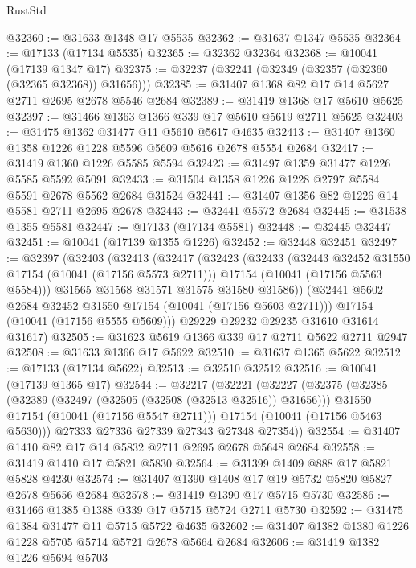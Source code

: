 \begin{lexlean}{RustStd}
\begin{coremodule}
@32360 := @31633 @1348 @17 @5535
@32362 := @31637 @1347 @5535
@32364 := @17133 (@17134 @5535)
@32365 := @32362 @32364
@32368 := @10041 (@17139 @1347 @17)
@32375 := @32237 (@32241 (@32349 (@32357 (@32360 (@32365 @32368)) @31656)))
@32385 := @31407 @1368 @82 @17 @14 @5627 @2711 @2695 @2678 @5546 @2684
@32389 := @31419 @1368 @17 @5610 @5625
@32397 := @31466 @1363 @1366 @339 @17 @5610 @5619 @2711 @5625
@32403 := @31475 @1362 @31477 @11 @5610 @5617 @4635
@32413 := @31407 @1360 @1358 @1226 @1228 @5596 @5609 @5616 @2678 @5554 @2684
@32417 := @31419 @1360 @1226 @5585 @5594
@32423 := @31497 @1359 @31477 @1226 @5585 @5592 @5091
@32433 := @31504 @1358 @1226 @1228 @2797 @5584 @5591 @2678 @5562 @2684 @31524
@32441 := @31407 @1356 @82 @1226 @14 @5581 @2711 @2695 @2678
@32443 := @32441 @5572 @2684
@32445 := @31538 @1355 @5581
@32447 := @17133 (@17134 @5581)
@32448 := @32445 @32447
@32451 := @10041 (@17139 @1355 @1226)
@32452 := @32448 @32451
@32497 := @32397
    (@32403
      (@32413
        (@32417
          (@32423
            (@32433
              (@32443 @32452 @31550 @17154 (@10041 (@17156 @5573 @2711)))
              @17154
              (@10041 (@17156 @5563 @5584)))
            @31565
            @31568
            @31571
            @31575
            @31580
            @31586))
        (@32441 @5602 @2684 @32452 @31550 @17154 (@10041 (@17156 @5603 @2711)))
        @17154
        (@10041 (@17156 @5555 @5609)))
      @29229
      @29232
      @29235
      @31610
      @31614
      @31617)
@32505 := @31623 @5619 @1366 @339 @17 @2711 @5622 @2711 @2947
@32508 := @31633 @1366 @17 @5622
@32510 := @31637 @1365 @5622
@32512 := @17133 (@17134 @5622)
@32513 := @32510 @32512
@32516 := @10041 (@17139 @1365 @17)
@32544 := @32217
    (@32221
      (@32227
        (@32375
          (@32385
            (@32389 (@32497 (@32505 (@32508 (@32513 @32516)) @31656)))
            @31550
            @17154
            (@10041 (@17156 @5547 @2711)))
          @17154
          (@10041 (@17156 @5463 @5630)))
        @27333
        @27336
        @27339
        @27343
        @27348
        @27354))
@32554 := @31407 @1410 @82 @17 @14 @5832 @2711 @2695 @2678 @5648 @2684
@32558 := @31419 @1410 @17 @5821 @5830
@32564 := @31399 @1409 @888 @17 @5821 @5828 @4230
@32574 := @31407 @1390 @1408 @17 @19 @5732 @5820 @5827 @2678 @5656 @2684
@32578 := @31419 @1390 @17 @5715 @5730
@32586 := @31466 @1385 @1388 @339 @17 @5715 @5724 @2711 @5730
@32592 := @31475 @1384 @31477 @11 @5715 @5722 @4635
@32602 := @31407 @1382 @1380 @1226 @1228 @5705 @5714 @5721 @2678 @5664 @2684
@32606 := @31419 @1382 @1226 @5694 @5703

\end{coremodule}
\end{lexlean}

